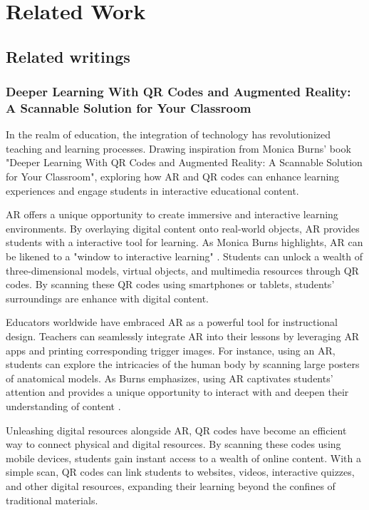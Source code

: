 \chapter{Related Work}\label{cap:relatedwork}
\section{Related writings}
\subsection*{Deeper Learning With QR Codes and Augmented Reality: A Scannable Solution for Your Classroom}

In the realm of education, the integration of technology has revolutionized teaching and learning processes.  Drawing inspiration from Monica Burns' book "Deeper Learning With QR Codes and Augmented Reality: A Scannable Solution for Your Classroom", exploring how \ac{AR} and \ac{QR} codes can enhance learning experiences and engage students in interactive educational content.

\acf{AR} offers a unique opportunity to create immersive and interactive learning environments. By overlaying digital content onto real-world objects, \ac{AR} provides students with a interactive tool for learning. As Monica Burns highlights, \ac{AR} can be likened to a "window to interactive learning" \cite{Burns2016}. Students can unlock a wealth of three-dimensional models, virtual objects, and multimedia resources through \acf{QR} codes. By scanning these \ac{QR} codes using smartphones or tablets, students' surroundings are enhance with digital content.

Educators worldwide have embraced \ac{AR} as a powerful tool for instructional design. Teachers can seamlessly integrate \ac{AR} into their lessons by leveraging \ac{AR} apps and printing corresponding trigger images. For instance, using an \acf{AR}, students can explore the intricacies of the human body by scanning large posters of anatomical models. As Burns emphasizes, using \ac{AR} captivates students' attention and provides a unique opportunity to interact with and deepen their understanding of content \cite{Burns2016}.

Unleashing digital resources alongside \ac{AR}, \ac{QR} codes have become an efficient way to connect physical and digital resources. By scanning these codes using mobile devices, students gain instant access to a wealth of online content. With a simple scan, \ac{QR} codes can link students to websites, videos, interactive quizzes, and other digital resources, expanding their learning beyond the confines of traditional materials.

